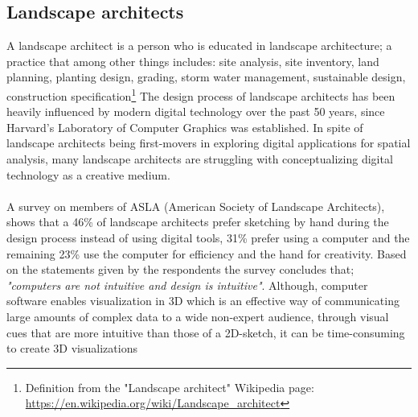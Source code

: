  	\subsection{Landscape architects}\label{whoSaysSo}
 	A landscape architect is a person who is educated in landscape architecture; a practice that among other things includes: site analysis, site inventory, land planning, planting design, grading, storm water management, sustainable design, construction specification\footnote{Definition from the "Landscape architect" Wikipedia page: \url{https://en.wikipedia.org/wiki/Landscape\_architect}}
 	The design process of landscape architects has been heavily influenced by modern digital technology over the past 50 years, since Harvard's Laboratory of Computer Graphics was established.\cite{landscapeArchitectureDigiTech} In spite of landscape architects being first-movers in exploring digital applications for spatial analysis, many landscape architects are struggling with conceptualizing digital technology as a creative medium\cite{landscapeArchitectureDigiTech}. \\
 	\\
 	A survey on members of ASLA (American Society of Landscape Architects)\cite{surveySketchVSDigital}, shows that a 46\% of landscape architects prefer sketching by hand during the design process instead of using digital tools, 31\% prefer using a computer and the remaining 23\% use the computer for efficiency and the hand for creativity. Based on the statements given by the respondents the survey concludes that; \textit{"computers are not intuitive and design is intuitive"}\cite{landscapeArchitectureDigiTech}\cite{surveySketchVSDigital}. Although, computer software enables visualization in 3D which is an effective way of communicating large amounts of complex data to a wide non-expert audience, through visual cues that are more intuitive than those of a 2D-sketch, it can be time-consuming to create 3D visualizations\cite{landscapeVisual}
 	
